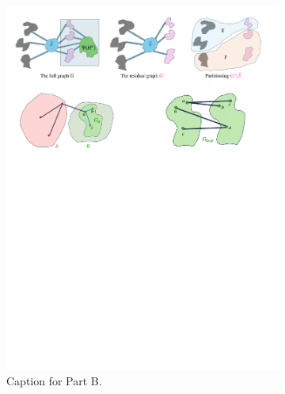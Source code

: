 \documentclass[11pt]{article}
\begin{document}
\begin{figure}
\begin{subfigure}[t]{0.3\textwidth}
        \includegraphics[width=\textwidth]{assets/part-b.pdf}
        \caption{\small Caption for Part B.}
    \end{subfigure}
    \hfill
    \begin{subfigure}[t]{0.3\textwidth}
        \centering

\end{subfigure}
\end{figure}
\end{document}
